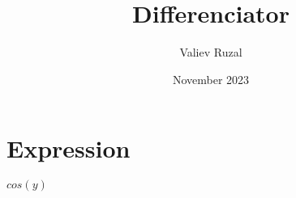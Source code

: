 \documentclass[a4paper, 12pt]{article}
\title{ Differenciator }
\author{Valiev Ruzal}
\date{November 2023}
\begin{document}
\maketitle
\section{Expression}
$ cos( y ) $
\end{document}
